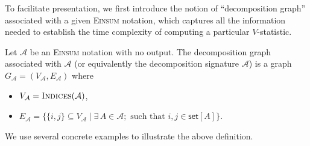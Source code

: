 \documentclass[twoside,11pt]{article}
\newcommand{\Lin}[1]{{\color{purple}{Lin: #1}}}
\def\Einsum{\textsc{Einsum}}
\newcommand{\takesetp}[1]{\mathsf{set}[#1]}
\newcommand{\indexset}{\textsc{Indices}}
\newcommand{\graphform}[1]{G_{#1}}
\def\calA{\mathcal{A}}
\begin{document}
To facilitate presentation, we first introduce the notion of ``decomposition graph'' associated with a given \Einsum{} notation, which captures all the information needed to establish the time complexity of computing a particular $V$-statistic.

\begin{definition}\label{def:graph_decomp}
Let $\calA$ be an \Einsum{} notation with no output. The decomposition graph associated with $\calA$ (or equivalently the decomposition signature $\calA$) is a graph $\graphform{\calA} = (V_{\calA}, E_{\calA})$ where
    \begin{itemize}
        \item $V_{\calA} = \indexset(\calA)$, 
        \item $E_{\calA} = \big\{ \{i, j\} \subseteq V_{\calA} \mid \exists \, A \in \calA; \text{ such that } i, j \in \takesetp{A} \big\}$.
    \end{itemize}
\end{definition}



We use several concrete examples to illustrate the above definition.
\end{document}
